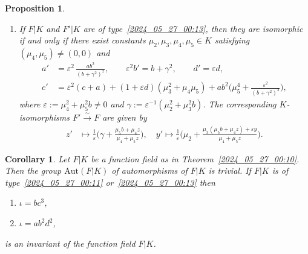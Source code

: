 \documentclass[12pt,reqno]{amsart}
\newtheorem{prop}[thm]{Proposition}
\newtheorem{cor}[thm]{Corollary}
\theoremstyle{definition}
\newcommand{\ga}{\gamma}
\newcommand{\eps}{\varepsilon}
\begin{document}
\begin{prop}
\begin{enumerate}[\upshape (a)]
    \item 
    If $F|K$ and $F'|K$ are of type~\ref{2024_05_27_00:13}, then they are isomorphic if and only if there exist constants $\mu_2,\mu_3,\mu_4,\mu_5 \in K$ satisfying $(\mu_4,\mu_5) \neq (0,0)$ and
    \begin{align*}
        a' &= \eps^2 \, \frac {ab^2} {(b + \ga^2)^2}, \qquad \eps^2 b' = b + \ga^2, \qquad d' = \eps d, \\
        c' &= \eps^2 (c + a) + (1 + \eps d) (\mu_3^2 + \mu_4 \mu_5) + a b^2 \Big( \mu_5^4 + \frac{\eps^2}{(b + \ga^2)^2} \Big),
    \end{align*}
    where $\eps := \mu_4^2 + \mu_5^2 b \neq 0$ and
    $\ga := \eps^{-1} (\mu_2^2 + \mu_3^2 b)$.
    The corresponding $K$-isomorphisms $F' \overset\sim\to F$ are given by
    \begin{align*}
        z' &\mapsto \frac 1 \eps \bigg( \ga + \frac{\mu_5 b + \mu_4 z}{\mu_4 + \mu_5 z}\bigg), \quad
        y' \mapsto \frac 1 \eps \bigg( \mu_2 + \frac{\mu_3 (\mu_5 b + \mu_4 z) + \eps y}{\mu_4 + \mu_5 z} \bigg).
    \end{align*}
\end{enumerate}
\end{prop}






\begin{cor}\label{2024_08_04_11:55}
Let $F|K$ be a function field as in Theorem~\ref{2024_05_27_00:10}.
Then the group $\mathrm{Aut}(F|K)$ of automorphisms of $F|K$ is trivial.
If $F|K$ is of type~\ref{2024_05_27_00:11} or~\ref{2024_05_27_00:13} then
\begin{enumerate}[\upshape (a)]
    \item $\iota = b c^3$,
    \setcounter{enumi}{2}
    \item $\iota = a b^2 d^2$,
\end{enumerate}
is an invariant of the function field $F|K$. 
\end{cor}
\end{document}

